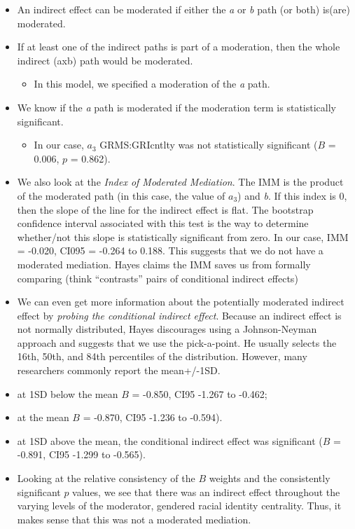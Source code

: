 \documentclass[
  english,
]{book}
\providecommand{\tightlist}{%
  \setlength{\itemsep}{0pt}\setlength{\parskip}{0pt}}
\begin{document}
\begin{itemize}
\tightlist
\item
  An indirect effect can be moderated if either the \emph{a} or \emph{b} path (or both) is(are) moderated.
\item
  If at least one of the indirect paths is part of a moderation, then the whole indirect (axb) path would be moderated.

  \begin{itemize}
  \tightlist
  \item
    In this model, we specified a moderation of the \emph{a} path.
  \end{itemize}
\item
  We know if the \emph{a} path is moderated if the moderation term is statistically significant.

  \begin{itemize}
  \tightlist
  \item
    In our case, \(a_{3}\) GRMS:GRIcntlty was not statistically significant (\(B\) = 0.006, \(p\) = 0.862).
  \end{itemize}
\item
  We also look at the \emph{Index of Moderated Mediation}. The IMM is the product of the moderated path (in this case, the value of \(a_{3}\)) and \emph{b}. If this index is 0, then the slope of the line for the indirect effect is flat. The bootstrap confidence interval associated with this test is the way to determine whether/not this slope is statistically significant from zero. In our case, IMM = -0.020, CI095 = -0.264 to 0.188. This suggests that we do not have a moderated mediation. Hayes claims the IMM saves us from formally comparing (think ``contrasts'' pairs of conditional indirect effects)
\item
  We can even get more information about the potentially moderated indirect effect by \emph{probing the conditional indirect effect}. Because an indirect effect is not normally distributed, Hayes discourages using a Johnson-Neyman approach and suggests that we use the pick-a-point. He usually selects the 16th, 50th, and 84th percentiles of the distribution. However, many researchers commonly report the mean+/-1SD.
\item
  at 1SD below the mean \(B\) = -0.850, CI95 -1.267 to -0.462;
\item
  at the mean \(B\) = -0.870, CI95 -1.236 to -0.594).\\
\item
  at 1SD above the mean, the conditional indirect effect was significant (\(B\) = -0.891, CI95 -1.299 to -0.565).\\
\item
  Looking at the relative consistency of the \(B\) weights and the consistently significant \(p\) values, we see that there was an indirect effect throughout the varying levels of the moderator, gendered racial identity centrality. Thus, it makes sense that this was not a moderated mediation.
\end{itemize}
\end{document}
